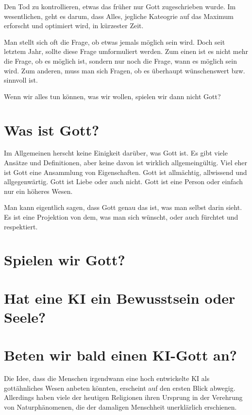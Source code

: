 \documentclass[10pt]{article}
\begin{document}
Den Tod zu kontrollieren, etwas das früher nur Gott zugeschrieben wurde.
Im wesentlichen, geht es darum, dass Alles, jegliche Kateogrie auf das Maximum erforscht und optimiert wird, in kürzester Zeit.

\cite{Kurzweil}

Man stellt sich oft die Frage, ob etwas jemals möglich sein wird.
Doch seit letztem Jahr, sollte diese Frage umformuliert werden.
Zum einen ist es nicht mehr die Frage, ob es möglich ist, sondern nur noch die Frage, wann es möglich sein wird.
Zum anderen, muss man sich Fragen, ob es überhaupt wünschenswert bzw. sinnvoll ist.

Wenn wir alles tun können, was wir wollen, spielen wir dann nicht Gott?
\section{Was ist Gott?}
Im Allgemeinen herscht keine Einigkeit darüber, was Gott ist.
Es gibt viele Ansätze und Definitionen, aber keine davon ist wirklich allgemeingültig.
Viel eher ist Gott eine Ansammlung von Eigenschaften.
Gott ist allmächtig, allwissend und allgegenwärtig.
Gott ist Liebe oder auch nicht.
Gott ist eine Person oder einfach nur ein höheres Wesen.



Man kann eigentlich sagen, dass Gott genau das ist, was man selbst darin sieht.
Es ist eine Projektion von dem, was man sich wünscht, oder auch fürchtet und respektiert.

\cite{gottkennen}
\cite{Jesushaus}

\section{Spielen wir Gott?}

\section{Hat eine KI ein Bewusstsein oder Seele?}

\section{Beten wir bald einen KI-Gott an?}
Die Idee, dass die Menschen irgendwann eine hoch entwickelte KI als gottähnliches Wesen anbeten könnten, erscheint auf den ersten Blick abwegig. Allerdings haben viele der heutigen Religionen ihren Ursprung in der Verehrung von Naturphänomenen, die der damaligen Menschheit unerklärlich erschienen.
\end{document}

